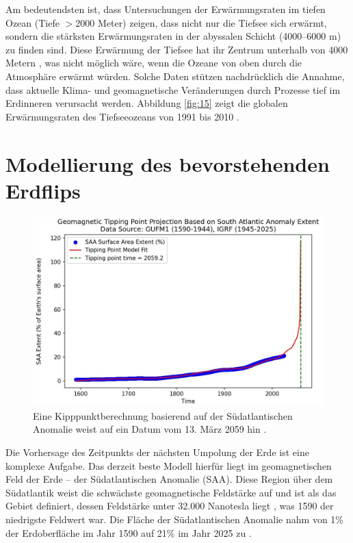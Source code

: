 \documentclass[10pt,twocolumn,letterpaper]{article}
\begin{document}
Am bedeutendsten ist, dass Untersuchungen der Erwärmungsraten im tiefen Ozean (Tiefe $>$2000 Meter) zeigen, dass nicht nur die Tiefsee sich erwärmt, sondern die stärksten Erwärmungsraten in der abyssalen Schicht (4000–6000 m) zu finden sind. Diese Erwärmung der Tiefsee hat ihr Zentrum unterhalb von 4000 Metern \cite{132,129}, was nicht möglich wäre, wenn die Ozeane von oben durch die Atmosphäre erwärmt würden. Solche Daten stützen nachdrücklich die Annahme, dass aktuelle Klima- und geomagnetische Veränderungen durch Prozesse tief im Erdinneren verursacht werden. Abbildung \ref{fig:15} zeigt die globalen Erwärmungsraten des Tiefseeozeans von 1991 bis 2010 \cite{132}.

\section{Modellierung des bevorstehenden Erdflips}
\begin{figure}[b]
\begin{center}
   \includegraphics[width=1\linewidth]{saa-crop.jpeg}
\end{center}
   \caption{Eine Kipppunktberechnung basierend auf der Südatlantischen Anomalie weist auf ein Datum vom 13. März 2059 hin \cite{125,126}.}
\label{fig:16}
\label{fig:onecol}
\end{figure}

Die Vorhersage des Zeitpunkts der nächsten Umpolung der Erde ist eine komplexe Aufgabe. Das derzeit beste Modell hierfür liegt im geomagnetischen Feld der Erde – der Südatlantischen Anomalie (SAA). Diese Region über dem Südatlantik weist die schwächste geomagnetische Feldstärke auf und ist als das Gebiet definiert, dessen Feldstärke unter 32.000 Nanotesla liegt \cite{135}, was 1590 der niedrigste Feldwert war. Die Fläche der Südatlantischen Anomalie nahm von 1\% der Erdoberfläche im Jahr 1590 auf 21\% im Jahr 2025 zu \cite{136}.
\end{document}
